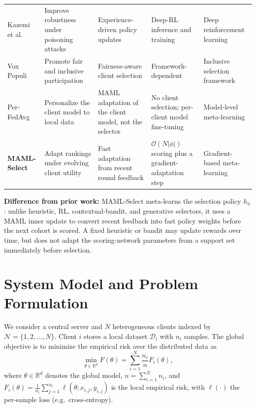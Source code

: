 \documentclass[journal]{IEEEtran}
\newcommand{\revision}[1]{#1}
\begin{document}
\begin{table}[!t]
\begin{tabularx}{\textwidth}{lXXXX}
        Kazemi et al.~\cite{kazemi2026robust} & Improve robustness under poisoning attacks & Experience-driven policy updates & Deep-RL inference and training & Deep reinforcement learning \\
        Vox Populi~\cite{arisdakessian2026vox} & Promote fair and inclusive participation & Fairness-aware client selection & Framework-dependent & Inclusive selection framework \\
        Per-FedAvg~\cite{fallah2020personalized} & Personalize the client model to local data & MAML adaptation of the client model, not the selector & No client selection; per-client model fine-tuning & Model-level meta-learning \\
        \textbf{MAML-Select} & Adapt rankings under evolving client utility & Fast adaptation from recent round feedback & $\mathcal{O}(N|\phi|)$ scoring plus a gradient-adaptation step & Gradient-based meta-learning \\
        \bottomrule
    \end{tabularx}
\end{table}

\revision{\textbf{Difference from prior work:} MAML-Select meta-learns the selection policy $h_\phi$: unlike heuristic, RL, contextual-bandit, and generative selectors, it uses a MAML inner update to convert recent feedback into fast policy weights before the next cohort is scored. A fixed heuristic or bandit may update rewards over time, but does not adapt the scoring-network parameters from a support set immediately before selection.}

\section{System Model and Problem Formulation}
\revision{We consider a central server and $N$ heterogeneous clients indexed by $\mathcal{N} = \{1, 2, \ldots, N\}$. Client $i$ stores a local dataset $\mathcal{D}_i$ with $n_i$ samples.} The global objective is to minimize the empirical risk over the distributed data as
\begin{equation}
	\min_{\theta \in \mathbb{R}^d} F(\theta) = \sum_{i=1}^{N} \frac{n_i}{n} F_i(\theta),
	\label{eq:global_objective}
\end{equation}
\revision{where $\theta \in \mathbb{R}^d$ denotes the global model, $n = \sum_{i=1}^{N} n_i$, and $F_i(\theta) = \frac{1}{n_i} \sum_{j=1}^{n_i} \ell(\theta; x_{i,j}, y_{i,j})$ is the local empirical risk, with $\ell(\cdot)$ the per-sample loss (e.g.\ cross-entropy).}
\end{document}
